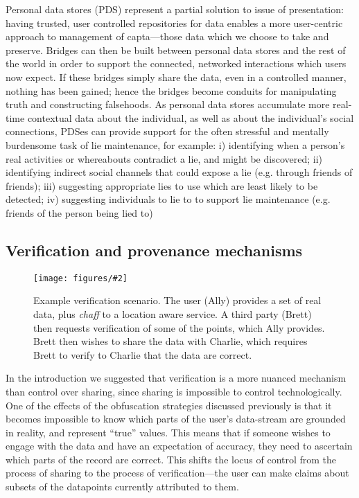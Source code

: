 \documentclass{IOS-Book-Article}     %
\newcommand{\fig}[3][0.9]{
\begin{figure}[tp]
\begin{center}
\texttt{[image: figures/\#2]}
\caption{#3}
\label{fig:#2}
\end{center}
\end{figure}
}
\begin{document}
Personal data stores (PDS) represent a partial solution to issue of
presentation: having trusted, user controlled repositories for data enables a
more user-centric approach to management of capta---those data which we choose
to take and preserve. Bridges can then be built between personal data stores and
the rest of the world in order to support the connected, networked interactions
which users now expect. If these bridges simply share the data, even in a
controlled manner, nothing has been gained; hence the bridges become conduits
for manipulating truth and constructing falsehoods. As personal data stores
accumulate more real-time contextual data about the individual, as well as about
the individual’s social connections, PDSes can provide support for the often
stressful and mentally burdensome task of lie maintenance, for example: i)
identifying when a person's real activities or whereabouts contradict a lie, and
might be discovered; ii) identifying indirect social channels that could expose
a lie (e.g. through friends of friends); iii) suggesting appropriate lies to use
which are least likely to be detected; iv) suggesting individuals to lie to to
support lie maintenance (e.g. friends of the person being lied to)


\subsection{Verification and provenance mechanisms}

\fig{Verification}{Example verification scenario. The user (Ally) provides a set
of real data, plus \emph{chaff} to a location aware service. A third party
(Brett) then requests verification of some of the points, which Ally
provides. Brett then wishes to share the data with Charlie, which requires Brett
to verify to Charlie that the data are correct.}

In the introduction we suggested that verification is a more nuanced mechanism
than control over sharing, since sharing is impossible to control
technologically. One of the effects of the obfuscation strategies discussed
previously is that it becomes impossible to know which parts of the user's
data-stream are grounded in reality, and represent ``true'' values. This means
that if someone wishes to engage with the data and have an expectation of
accuracy, they need to ascertain which parts of the record are correct. This
shifts the locus of control from the process of sharing to the process of
verification---the user can make claims about subsets of the datapoints
currently attributed to them.
\end{document}

